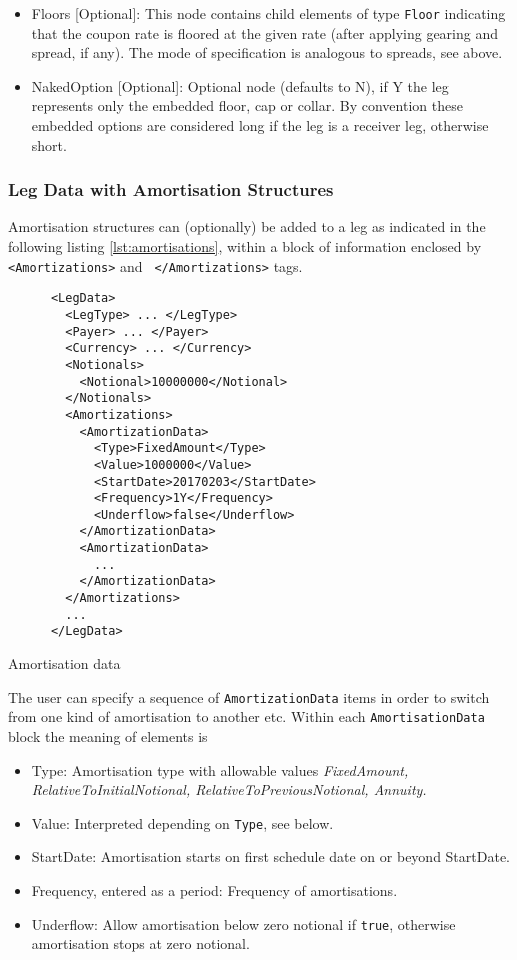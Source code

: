 \begin{itemize}
\item Floors [Optional]: This node contains child elements of type \lstinline!Floor! indicating that the coupon rate is floored at
  the given rate (after applying gearing and spread, if any). The mode of specification is analogous to spreads, see
  above.

\item NakedOption [Optional]: Optional node (defaults to N), if Y the leg represents only the embedded floor, cap or collar. 
By convention these embedded options are considered long if the leg is a receiver leg, otherwise short. 

\end{itemize}

\subsubsection{Leg Data with Amortisation Structures}
\label{ss:amortisationdata}

Amortisation structures can (optionally) be added to a leg as
indicated in the following listing \ref{lst:amortisations}, within a
block of information enclosed by {\tt <Amortizations>} and {\tt
  </Amortizations>} tags.

\begin{listing}[H]
\begin{verbatim}
      <LegData>
        <LegType> ... </LegType>
        <Payer> ... </Payer>
        <Currency> ... </Currency>
        <Notionals>
          <Notional>10000000</Notional>
        </Notionals>
        <Amortizations>
          <AmortizationData>
            <Type>FixedAmount</Type>
            <Value>1000000</Value>
            <StartDate>20170203</StartDate>
            <Frequency>1Y</Frequency>
            <Underflow>false</Underflow>
          </AmortizationData>
          <AmortizationData>
            ...
          </AmortizationData>
        </Amortizations>
        ...
      </LegData>
\end{verbatim}
\caption{Amortisation data}
\label{lst:amortisations}
\end{listing}

The user can specify a sequence of {\tt AmortizationData} items in
order to switch from one kind of amortisation to another etc.  
Within each {\tt AmortisationData} block the meaning of elements is

\begin{itemize}
\item Type: Amortisation type with allowable values {\em FixedAmount,
  RelativeToInitialNotional, RelativeToPreviousNotional, Annuity.}
\item Value: Interpreted depending on {\tt Type}, see below.
\item StartDate: Amortisation starts on first schedule date on or
  beyond StartDate.
\item Frequency, entered as a period: Frequency of amortisations.
\item Underflow:  Allow amortisation below zero notional if {\tt true},
  otherwise amortisation stops at zero notional.
\end{itemize}

